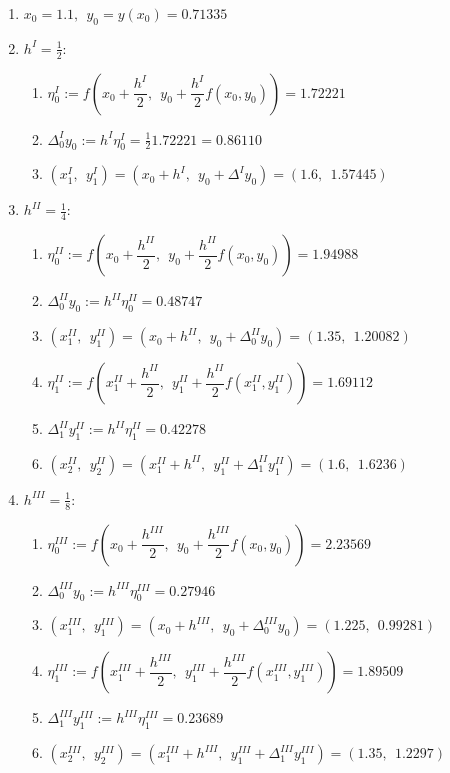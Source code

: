 \begin{enumerate}
    \item $x_0 = 1.1, ~~ y_0 = y(x_0) = 0.71335$

    \item $h^{I} = \frac{1}{2}:$
    \begin{enumerate}
        \item $\eta_0^{I} := f\left(x_0+\dfrac{h^{I}}{2},~~ y_0+\dfrac{h^{I}}{2}f(x_0,y_0)\right) = 1.72221$
        \item $\Delta_0^{I} y_0 := h^{I}\eta_0^{I} = \frac{1}{2} 1.72221 = 0.86110$
        \item $(x_1^{I},~~ y_1^{I}) = (x_0+h^{I}, ~~y_0 + \Delta^{I} y_0) = \mathbf{(1.6, ~~1.57445)}$
    \end{enumerate}

    \item $h^{II} = \frac{1}{4}:$
    \begin{enumerate}
        \item $\eta_0^{II} := f\left(x_0+\dfrac{h^{II}}{2},~~ y_0+\dfrac{h^{II}}{2}f(x_0,y_0)\right) = 1.94988$
        \item $\Delta_0^{II} y_0 := h^{II}\eta_0^{II} = 0.48747$
        \item $(x_1^{II},~~ y_1^{II}) = (x_0+h^{II}, ~~y_0 + \Delta_0^{II} y_0) = (1.35, ~~ 1.20082)$

        \item $\eta_1^{II} := f\left(x_1^{II}+\dfrac{h^{II}}{2},~~ y_1^{II}+\dfrac{h^{II}}{2}f(x_1^{II},y_1^{II})\right) = 1.69112$
        \item $\Delta_1^{II} y_1^{II} := h^{II}\eta_1^{II}  = 0.42278$
        \item $(x_2^{II},~~ y_2^{II}) = (x_1^{II}+h^{II}, ~~y_1^{II} + \Delta_1^{II} y_1^{II}) = \mathbf{(1.6, ~~ 1.6236)}$
    \end{enumerate}

    \item $h^{III} = \frac{1}{8}:$
    \begin{enumerate}
        \item $\eta_0^{III} := f\left(x_0+\dfrac{h^{III}}{2},~~ y_0+\dfrac{h^{III}}{2}f(x_0,y_0)\right) = 2.23569$
        \item $\Delta_0^{III} y_0 := h^{III}\eta_0^{III} = 0.27946$
        \item $(x_1^{III},~~ y_1^{III}) = (x_0+h^{III}, ~~y_0 + \Delta_0^{III} y_0) = (1.225, ~~0.99281)$

        \item $\eta_1^{III} := f\left(x_1^{III}+\dfrac{h^{III}}{2},~~ y_1^{III}+\dfrac{h^{III}}{2}f(x_1^{III},y_1^{III})\right) = 1.89509$
        \item $\Delta_1^{III} y_1^{III} := h^{III}\eta_1^{III} = 0.23689$
        \item $(x_2^{III},~~ y_2^{III}) = (x_1^{III}+h^{III}, ~~y_1^{III} + \Delta_1^{III} y_1^{III}) = (1.35, ~~ 1.2297)$


\end{enumerate}
\end{enumerate}
